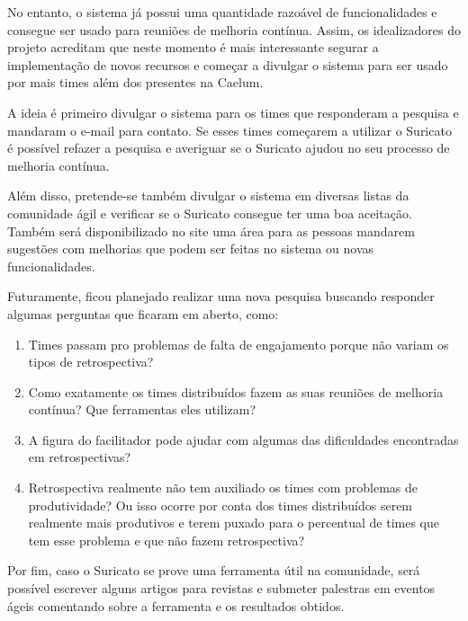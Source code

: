 No entanto, o sistema já possui uma quantidade razoável de funcionalidades e consegue ser usado para reuniões de melhoria contínua. Assim, os idealizadores do projeto acreditam que neste momento é mais interessante segurar a implementação de novos recursos e começar a divulgar o sistema para ser usado por mais times além dos presentes na Caelum.

A ideia é primeiro divulgar o sistema para os times que responderam a pesquisa e mandaram o e-mail para contato. Se esses times começarem a utilizar o Suricato é possível refazer a pesquisa e averiguar se o Suricato ajudou no seu processo de melhoria contínua.

Além disso, pretende-se também divulgar o sistema em diversas listas da comunidade ágil e verificar se o Suricato consegue ter uma boa aceitação. Também será disponibilizado no site uma área para as pessoas mandarem sugestões com melhorias que podem ser feitas no sistema ou novas funcionalidades.

Futuramente, ficou planejado realizar uma nova pesquisa buscando responder algumas perguntas que ficaram em aberto, como:

\begin{enumerate}
	\item Times passam pro problemas de falta de engajamento porque não variam os tipos de retrospectiva?
	\item Como exatamente os times distribuídos fazem as suas reuniões de melhoria contínua? Que ferramentas eles utilizam?
	\item A figura do facilitador pode ajudar com algumas das dificuldades encontradas em retrospectivas?
	\item Retrospectiva realmente não tem auxiliado os times com problemas de produtividade? Ou isso ocorre por conta dos times distribuídos serem realmente mais produtivos e terem puxado para  o percentual de times que tem esse problema e que não fazem retrospectiva?
\end{enumerate}

Por fim, caso o Suricato se prove uma ferramenta útil na comunidade, será possível escrever alguns artigos para revistas e submeter palestras em eventos ágeis comentando sobre a ferramenta e os resultados obtidos. 
